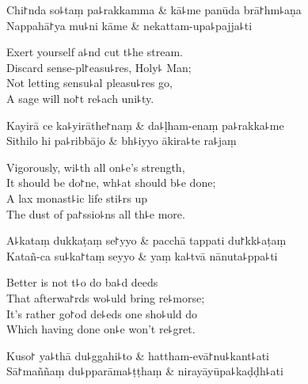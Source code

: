 \begin{twochants}
  Chi꜓nda so꜕taṃ pa꜕rakkamma & kā꜕me panūda brā꜓hm꜕aṇa \\
  Nappahā꜓ya mu꜕ni kāme & nekattam-upa꜕pajja꜕ti \\
\end{twochants}

\begin{english}
  Exert yourself a꜕nd cut t꜕he stream.\\
  Discard sense-pl꜓easu꜕res, Holy꜕ Man;\\
  Not letting sensu꜕al pleasu꜕res go,\\
  A sage will no꜓t re꜕ach uni꜕ty.
\end{english}

\begin{twochants}
  Kayirā ce ka꜕yirāthe꜓naṃ & da꜕ḷham-enaṃ pa꜕rakka꜕me \\
  Sithilo hi pa꜕ribbājo & bh꜕iyyo ākira꜕te ra꜕jaṃ \\
\end{twochants}

\begin{english}
  Vigorously, wi꜕th all on꜕e's strength,\\
  It should be do꜓ne, wh꜕at should b꜕e done;\\
  A lax monast꜕ic life sti꜕rs up\\
  The dust of pa꜓ssio꜕ns all th꜕e more.
\end{english}

\begin{twochants}
  A꜕kataṃ dukkaṭaṃ se꜓yyo & pacchā tappati du꜓kk꜕aṭaṃ \\
  Katañ-ca su꜕ka꜓taṃ seyyo & yaṃ ka꜕tvā nānuta꜕ppa꜕ti \\
\end{twochants}

\begin{english}
  Better is not t꜕o do ba꜕d deeds\\
  That afterwa꜓rds wo꜕uld bring re꜕morse;\\
  It's rather go꜓od de꜕eds one sho꜕uld do\\
  Which having done on꜕e won't re꜕gret.
\end{english}

\begin{twochants}
  Kuso꜓ ya꜕thā du꜕ggahi꜕to & hattham-evā꜓nu꜕kant꜕ati \\
  Sā꜓maññaṃ du꜕pparāma꜕ṭṭhaṃ & nirayāyūpa꜕kaḍḍh꜕ati \\
\end{twochants}

